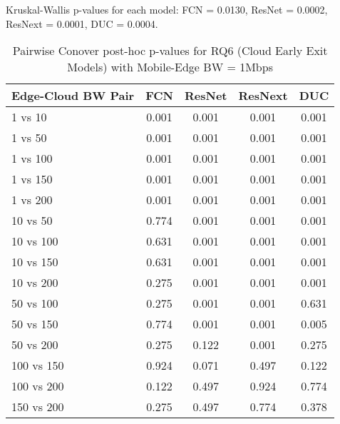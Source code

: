 \begin{table}[h]
\centering
\caption{Pairwise Conover post-hoc p-values for RQ6 (Cloud Early Exit Models) with Mobile-Edge BW = 1Mbps}
\label{tab:conover_cloud_earlyexit_me1}
\smallskip
Kruskal-Wallis p-values for each model: FCN = 0.0130, ResNet = 0.0002, ResNext = 0.0001, DUC = 0.0004.

\begin{tabular}{lcccc}
\toprule
Edge-Cloud BW Pair & FCN & ResNet & ResNext & DUC \\
\midrule
1 vs 10 & 0.001 & 0.001 & 0.001 & 0.001 \\
1 vs 50 & 0.001 & 0.001 & 0.001 & 0.001 \\
1 vs 100 & 0.001 & 0.001 & 0.001 & 0.001 \\
1 vs 150 & 0.001 & 0.001 & 0.001 & 0.001 \\
1 vs 200 & 0.001 & 0.001 & 0.001 & 0.001 \\
10 vs 50 & 0.774 & 0.001 & 0.001 & 0.001 \\
10 vs 100 & 0.631 & 0.001 & 0.001 & 0.001 \\
10 vs 150 & 0.631 & 0.001 & 0.001 & 0.001 \\
10 vs 200 & 0.275 & 0.001 & 0.001 & 0.001 \\
50 vs 100 & 0.275 & 0.001 & 0.001 & 0.631 \\
50 vs 150 & 0.774 & 0.001 & 0.001 & 0.005 \\
50 vs 200 & 0.275 & 0.122 & 0.001 & 0.275 \\
100 vs 150 & 0.924 & 0.071 & 0.497 & 0.122 \\
100 vs 200 & 0.122 & 0.497 & 0.924 & 0.774 \\
150 vs 200 & 0.275 & 0.497 & 0.774 & 0.378 \\
\bottomrule
\end{tabular}
\end{table}

